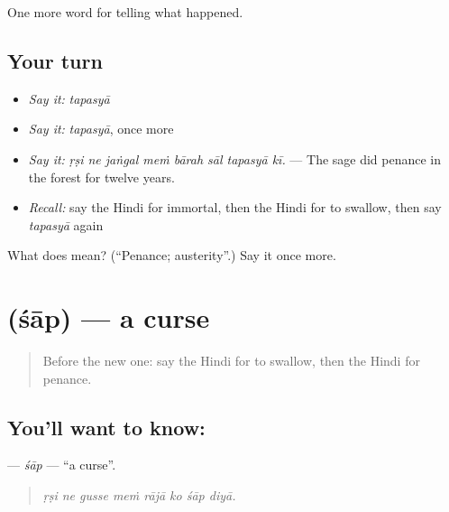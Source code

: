 \begin{grammarlens}[title={What you've built}]
One more word for telling what happened.
\end{grammarlens}

\subsection*{Your turn}
\begin{itemize}
\raggedright
  \item \emph{Say it:} \emph{tapasyā}
  \item \emph{Say it:} \emph{tapasyā}, once more
  \item \emph{Say it:} \emph{ṛṣi ne jaṅgal meṁ bārah sāl tapasyā kī.} — The sage did penance in the forest for twelve years.
  \item \emph{Recall:} say the Hindi for immortal, then the Hindi for to swallow, then say \emph{tapasyā} again
\end{itemize}

\begin{tcolorbox}[breakable,colback=teal!4,colframe=teal!35!black,title={Before you move on}]
What does  mean? (\textquotedblleft{}Penance; austerity\textquotedblright{}.) Say it once more.
\end{tcolorbox}
\section[\texorpdfstring{\hi{शाप} (śāp)}{शाप (śāp)}]{ (śāp) — a curse}

\label{lesson:HI-C336-sap}



\begin{quote}
Before the new one: say the Hindi for to swallow, then the Hindi for penance.
\end{quote}

\subsection*{You'll want to know: }
\textbf{} — \emph{śāp} — \textquotedblleft{}a curse\textquotedblright{}.

\begin{quote}
       
\end{quote}

\begin{quote}
\emph{ṛṣi ne gusse meṁ rājā ko śāp diyā.}
\end{quote}

